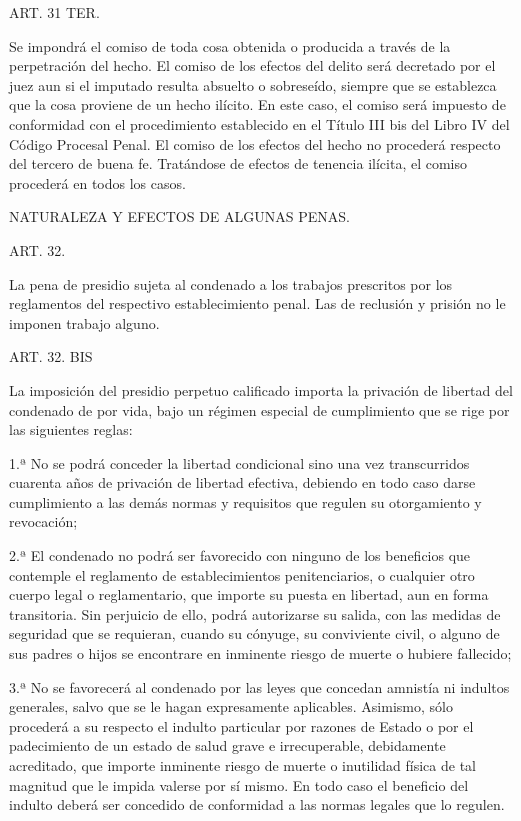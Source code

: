    ART. 31 TER.

    Se impondrá el comiso de toda cosa obtenida o producida a través de la perpetración del hecho.
    El comiso de los efectos del delito será decretado por el juez aun si el imputado resulta absuelto o sobreseído, siempre que se establezca que la cosa proviene de un hecho ilícito. En este caso, el comiso será impuesto de conformidad con el procedimiento establecido en el Título III bis del Libro IV del Código Procesal Penal.
    El comiso de los efectos del hecho no procederá respecto del tercero de buena fe.
    Tratándose de efectos de tenencia ilícita, el comiso procederá en todos los casos.
   

    NATURALEZA Y EFECTOS DE ALGUNAS PENAS.


    ART. 32.

    La pena de presidio sujeta al condenado a los trabajos prescritos por los reglamentos del respectivo establecimiento penal. Las de reclusión y prisión no le imponen trabajo alguno.


    ART. 32. BIS

    La imposición del presidio perpetuo calificado importa la privación de libertad del condenado de por vida, bajo un régimen especial de cumplimiento que se rige por las siguientes reglas:

    1.ª No se podrá conceder la libertad condicional sino una vez transcurridos cuarenta años de privación de libertad efectiva, debiendo en todo caso darse cumplimiento a las demás normas y requisitos que regulen su otorgamiento y revocación;

    2.ª El condenado no podrá ser favorecido con ninguno de los beneficios que contemple el reglamento de establecimientos penitenciarios, o cualquier otro cuerpo legal o reglamentario, que importe su puesta en libertad, aun en forma transitoria. Sin perjuicio de ello, podrá autorizarse su salida, con las medidas de seguridad que se requieran, cuando su cónyuge, su conviviente civil, o alguno de sus padres o hijos se encontrare en inminente riesgo de muerte o hubiere fallecido;

    3.ª No se favorecerá al condenado por las leyes que concedan amnistía ni indultos generales, salvo que se le hagan expresamente aplicables. Asimismo, sólo procederá a su respecto el indulto particular por razones de Estado o por el padecimiento de un estado de salud grave e irrecuperable, debidamente acreditado, que importe inminente riesgo de muerte o inutilidad física de tal magnitud que le impida valerse por sí mismo. En todo caso el beneficio del indulto deberá ser concedido de conformidad a las normas legales que lo regulen.




